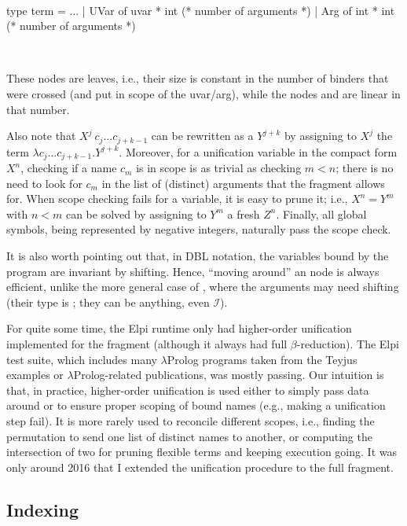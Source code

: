 \documentclass[a4paper, 11pt]{book}
\newenvironment{ocamlcode}
  {\VerbatimEnvironment~\\\begin{ocamlbox}\begin{xocamlcode}}{\end{xocamlcode}
\end{ocamlbox}\\}
\begin{document}
\begin{ocamlcode}
type term =
  ...
  | UVar of uvar * int (* number of arguments *)
  | Arg  of int  * int (* number of arguments *)
\end{ocamlcode}


\noindent
These nodes are leaves, i.e., their size is constant in the number of binders
that were crossed (and put in scope of the uvar/arg), while the nodes
 and  are linear in that number.


Also note that $X^j\ c_j \ldots c_{j + k-1}$ can be rewritten as a $Y^{j+k}$
by assigning to $X^j$ the term $\lambda c_j \ldots c_{j + k-1}. Y^{j+k}$.
Moreover, for a unification variable in the compact form $X^n$, checking if a
name $c_m$ is in scope is as trivial as checking $m < n$; there is no need to
look for $c_m$ in the list of (distinct) arguments that the \theotherfragment
fragment allows for. When scope checking fails for a variable, it is easy to
prune it; i.e., $X^n = Y^m$ with $n < m$ can be solved by assigning to $Y^m$ a
fresh $Z^n$. Finally, all global symbols, being represented by negative
integers, naturally pass the scope check.


It is also worth pointing out that, in DBL notation, the variables bound by the
program are invariant by shifting. Hence, ``moving around'' an  node
is always efficient, unlike the more general case of , where
the arguments may need shifting (their type is ; they can be
anything, even $\mathcal{I}$).


For quite some time, the Elpi runtime only had higher-order unification
implemented for the \thefragment fragment (although it always had full
$\beta$-reduction). The Elpi test suite, which includes many $\lambda$Prolog
programs taken from the Teyjus examples or $\lambda$Prolog-related
publications, was mostly passing. Our intuition is that, in practice,
higher-order unification is used either to simply pass data around or to
ensure proper scoping of bound names (e.g., making a unification step fail).
It is more rarely used to reconcile different scopes, i.e., finding the
permutation to send one list of distinct names to another, or computing the
intersection of two for pruning flexible terms and keeping execution going.
It was only around 2016 that I extended the unification procedure to the full
\theotherfragment fragment.


\subsection{Indexing}
\end{document}
